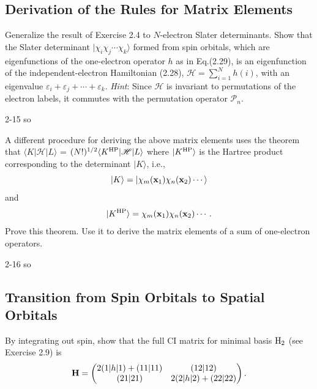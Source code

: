 \documentclass[a4paper]{book}
\begin{document}
	\subsection{Derivation of the Rules for Matrix Elements}
	
	\begin{exercise}
	Generalize the result of Exercise 2.4 to $N$-electron Slater determinants. Show that the Slater determinant $| \chi_i \chi_j \cdots \chi_k \rangle$ formed from spin orbitals, which are eigenfunctions of the one-electron operator $h$ as in Eq.(2.29), is an eigenfunction of the independent-electron Hamiltonian (2.28), $\mathscr{H} = \sum_{i=1}^N h(i)$, with an eigenvalue $\varepsilon_i + \varepsilon_j + \cdots + \varepsilon_k$. {\it Hint}: Since $\mathscr{H}$ is invariant to permutations of the electron labels, it commutes with the permutation operator $\mathscr{P}_n$.
	\end{exercise}
	
	\begin{solution}
		2-15 so
	\end{solution}
	
	\begin{exercise}
	A different procedure for deriving the above matrix elements uses the theorem that $\langle K | \mathscr{H} | L \rangle$ = $(N!)^{1/2} \langle K^{\rm HP} | \mathscr{H} | L \rangle$ where $|K^{\rm HP} \rangle$ is the Hartree product corresponding to the determinant $| K \rangle$, i.e.,
	\[
		| K \rangle = | \chi_m( {\bf x}_1 ) \chi_n( {\bf x}_2 ) \cdots \rangle
	\]
	and
	\[
		| K^{\rm HP} \rangle = \chi_m( {\bf x}_1 ) \chi_n( {\bf x}_2 ) \cdots.
	\]
	Prove this theorem. Use it to derive the matrix elements of a sum of one-electron operators.
	\end{exercise}
	
	\begin{solution}
		2-16 so
	\end{solution}
	
	\subsection{Transition from Spin Orbitals to Spatial Orbitals}
	
	\begin{exercise}
	By integrating out spin, show that the full CI matrix for minimal basis $\ce{H2}$ (see Exercise 2.9) is
	\[
		{\bf H} = \begin{pmatrix}
			2(1|h|1) + (11|11) & (12|12) \\
			(21|21) & 2(2|h|2) + (22|22)
		\end{pmatrix}.
	\]
	\end{exercise}
	
\end{document}
